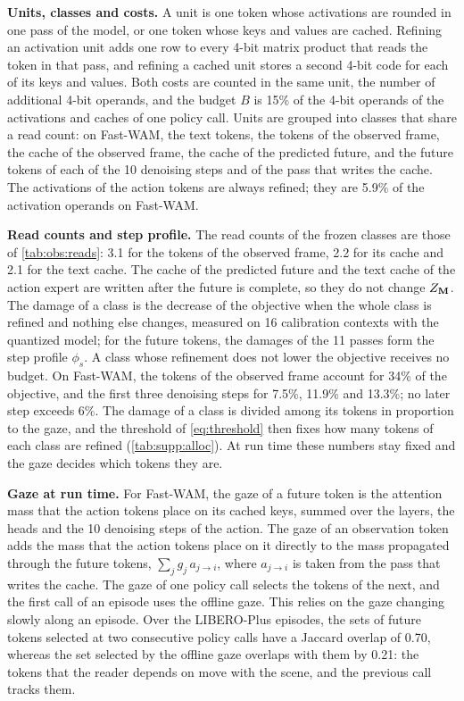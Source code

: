 \noindent\textbf{Units, classes and costs.}
A unit is one token whose activations are rounded in one pass of the model, or one token whose keys and values are cached.
Refining an activation unit adds one row to every 4-bit matrix product that reads the token in that pass, and refining a cached unit stores a second 4-bit code for each of its keys and values.
Both costs are counted in the same unit, the number of additional 4-bit operands, and the budget $B$ is 15\% of the 4-bit operands of the activations and caches of one policy call.
Units are grouped into classes that share a read count: on Fast-WAM, the text tokens, the tokens of the observed frame, the cache of the observed frame, the cache of the predicted future, and the future tokens of each of the 10 denoising steps and of the pass that writes the cache.
The activations of the action tokens are always refined; they are 5.9\% of the activation operands on Fast-WAM.

\noindent\textbf{Read counts and step profile.}
The read counts of the frozen classes are those of \cref{tab:obs:reads}: 3.1 for the tokens of the observed frame, 2.2 for its cache and 2.1 for the text cache.
The cache of the predicted future and the text cache of the action expert are written after the future is complete, so they do not change $Z_{\mathbf{M}}$.
The damage of a class is the decrease of the objective when the whole class is refined and nothing else changes, measured on 16 calibration contexts with the quantized model; for the future tokens, the damages of the 11 passes form the step profile $\phi_s$.
A class whose refinement does not lower the objective receives no budget.
On Fast-WAM, the tokens of the observed frame account for 34\% of the objective, and the first three denoising steps for 7.5\%, 11.9\% and 13.3\%; no later step exceeds 6\%.
The damage of a class is divided among its tokens in proportion to the gaze, and the threshold of \cref{eq:threshold} then fixes how many tokens of each class are refined (\cref{tab:supp:alloc}).
At run time these numbers stay fixed and the gaze decides which tokens they are.

\noindent\textbf{Gaze at run time.}
For Fast-WAM, the gaze of a future token is the attention mass that the action tokens place on its cached keys, summed over the layers, the heads and the 10 denoising steps of the action.
The gaze of an observation token adds the mass that the action tokens place on it directly to the mass propagated through the future tokens, $\sum_j g_j\, a_{j \to i}$, where $a_{j \to i}$ is taken from the pass that writes the cache.
The gaze of one policy call selects the tokens of the next, and the first call of an episode uses the offline gaze.
This relies on the gaze changing slowly along an episode.
Over the LIBERO-Plus episodes, the sets of future tokens selected at two consecutive policy calls have a Jaccard overlap of 0.70, whereas the set selected by the offline gaze overlaps with them by 0.21: the tokens that the reader depends on move with the scene, and the previous call tracks them.

